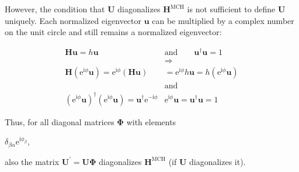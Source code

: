 \documentclass[a4paper,11pt,DIV=15,openany,twoside=false]{scrbook}
\newcommand{\ttmdump}[1]{#1}
\newcommand{\E}{\ensuremath{\mathrm{e}}}
\newcommand{\I}{\ensuremath{\mathrm{i}}}
\newcommand{\VEC}[1]{\ensuremath{\mathbf{#1}}}
\begin{document}
However, the condition that $\VEC{U}$ diagonalizes $\VEC{H}^{\text{MCH}}$ is not sufficient to define $\VEC{U}$ uniquely. Each normalized eigenvector $\VEC{u}$ can be multiplied by a complex number on the unit circle and still remains a normalized eigenvector:
\ttmdump{
  \begin{align}
    \VEC{H}\VEC{u}=h\VEC{u}
    \qquad&\text{and}\qquad
    \VEC{u}^\dagger\VEC{u}=1\\
    &\Rightarrow\nonumber\\
    \VEC{H}\left(\E^{\I\phi}\VEC{u}\right)
    =\E^{\I\phi}\left(\VEC{H}\VEC{u}\right)
    &=\E^{\I\phi}h\VEC{u}
    =h\left(\E^{\I\phi}\VEC{u}\right)\\
    &\text{and}\nonumber\\
    \left(\E^{\I\phi}\VEC{u}\right)^\dagger\left(\E^{\I\phi}\VEC{u}\right)
    =\VEC{u}^\dagger\E^{-\I\phi}&\E^{\I\phi}\VEC{u}
    =\VEC{u}^\dagger\VEC{u}=1
  \end{align}
}
Thus, for all diagonal matrices $\boldsymbol{\Phi}$ with elements 
\ttmdump{
  $\delta_{\beta\alpha}\E^{\I\phi_\beta}$, 
}
also the matrix $\VEC{U}^\prime=\VEC{U}\boldsymbol{\Phi}$ diagonalizes $\VEC{H}^{\text{MCH}}$ (if $\VEC{U}$ diagonalizes it).
\end{document}
